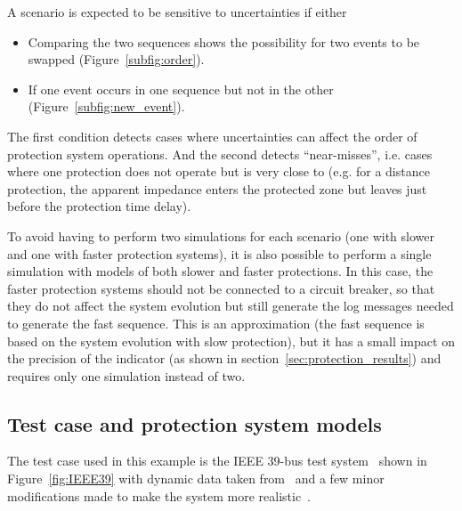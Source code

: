 A scenario is expected to be sensitive to uncertainties if either

\begin{itemize}
    \item Comparing the two sequences shows the possibility for two events to be swapped (Figure~\ref{subfig:order}).
    \item If one event occurs in one sequence but not in the other (Figure~\ref{subfig:new_event}).
\end{itemize}

The first condition detects cases where uncertainties can affect the order of protection system operations. And the second detects ``near-misses'', i.e. cases where one protection does not operate but is very close to (e.g. for a distance protection, the apparent impedance enters the protected zone but leaves just before the protection time delay).

To avoid having to perform two simulations for each scenario (one with slower and one with faster protection systems), it is also possible to perform a single simulation with models of both slower and faster protections. In this case, the faster protection systems should not be connected to a circuit breaker, so that they do not affect the system evolution but still generate the log messages needed to generate the fast sequence. This is an approximation (the fast sequence is based on the system evolution with slow protection), but it has a small impact on the precision of the indicator (as shown in section~\ref{sec:protection_results}) and requires only one simulation instead of two.


\subsection{Test case and protection system models}
\label{sec:protection_test_case}

The test case used in this example is the IEEE 39-bus test system~\cite{IEEE39} shown in Figure~\ref{fig:IEEE39} with dynamic data taken from~\cite{IEEE39Dynamic} and a few minor modifications made to make the system more realistic~\cite{ISGT2023_Protections}.

